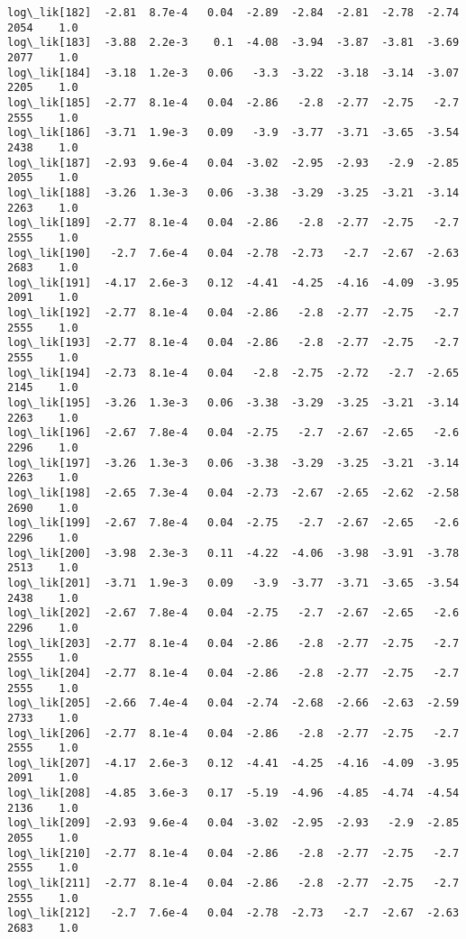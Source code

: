 \documentclass[11pt]{article}
\begin{document}
\begin{Verbatim}[commandchars=\\\{\}]
log\_lik[182]  -2.81  8.7e-4   0.04  -2.89  -2.84  -2.81  -2.78  -2.74   2054    1.0
log\_lik[183]  -3.88  2.2e-3    0.1  -4.08  -3.94  -3.87  -3.81  -3.69   2077    1.0
log\_lik[184]  -3.18  1.2e-3   0.06   -3.3  -3.22  -3.18  -3.14  -3.07   2205    1.0
log\_lik[185]  -2.77  8.1e-4   0.04  -2.86   -2.8  -2.77  -2.75   -2.7   2555    1.0
log\_lik[186]  -3.71  1.9e-3   0.09   -3.9  -3.77  -3.71  -3.65  -3.54   2438    1.0
log\_lik[187]  -2.93  9.6e-4   0.04  -3.02  -2.95  -2.93   -2.9  -2.85   2055    1.0
log\_lik[188]  -3.26  1.3e-3   0.06  -3.38  -3.29  -3.25  -3.21  -3.14   2263    1.0
log\_lik[189]  -2.77  8.1e-4   0.04  -2.86   -2.8  -2.77  -2.75   -2.7   2555    1.0
log\_lik[190]   -2.7  7.6e-4   0.04  -2.78  -2.73   -2.7  -2.67  -2.63   2683    1.0
log\_lik[191]  -4.17  2.6e-3   0.12  -4.41  -4.25  -4.16  -4.09  -3.95   2091    1.0
log\_lik[192]  -2.77  8.1e-4   0.04  -2.86   -2.8  -2.77  -2.75   -2.7   2555    1.0
log\_lik[193]  -2.77  8.1e-4   0.04  -2.86   -2.8  -2.77  -2.75   -2.7   2555    1.0
log\_lik[194]  -2.73  8.1e-4   0.04   -2.8  -2.75  -2.72   -2.7  -2.65   2145    1.0
log\_lik[195]  -3.26  1.3e-3   0.06  -3.38  -3.29  -3.25  -3.21  -3.14   2263    1.0
log\_lik[196]  -2.67  7.8e-4   0.04  -2.75   -2.7  -2.67  -2.65   -2.6   2296    1.0
log\_lik[197]  -3.26  1.3e-3   0.06  -3.38  -3.29  -3.25  -3.21  -3.14   2263    1.0
log\_lik[198]  -2.65  7.3e-4   0.04  -2.73  -2.67  -2.65  -2.62  -2.58   2690    1.0
log\_lik[199]  -2.67  7.8e-4   0.04  -2.75   -2.7  -2.67  -2.65   -2.6   2296    1.0
log\_lik[200]  -3.98  2.3e-3   0.11  -4.22  -4.06  -3.98  -3.91  -3.78   2513    1.0
log\_lik[201]  -3.71  1.9e-3   0.09   -3.9  -3.77  -3.71  -3.65  -3.54   2438    1.0
log\_lik[202]  -2.67  7.8e-4   0.04  -2.75   -2.7  -2.67  -2.65   -2.6   2296    1.0
log\_lik[203]  -2.77  8.1e-4   0.04  -2.86   -2.8  -2.77  -2.75   -2.7   2555    1.0
log\_lik[204]  -2.77  8.1e-4   0.04  -2.86   -2.8  -2.77  -2.75   -2.7   2555    1.0
log\_lik[205]  -2.66  7.4e-4   0.04  -2.74  -2.68  -2.66  -2.63  -2.59   2733    1.0
log\_lik[206]  -2.77  8.1e-4   0.04  -2.86   -2.8  -2.77  -2.75   -2.7   2555    1.0
log\_lik[207]  -4.17  2.6e-3   0.12  -4.41  -4.25  -4.16  -4.09  -3.95   2091    1.0
log\_lik[208]  -4.85  3.6e-3   0.17  -5.19  -4.96  -4.85  -4.74  -4.54   2136    1.0
log\_lik[209]  -2.93  9.6e-4   0.04  -3.02  -2.95  -2.93   -2.9  -2.85   2055    1.0
log\_lik[210]  -2.77  8.1e-4   0.04  -2.86   -2.8  -2.77  -2.75   -2.7   2555    1.0
log\_lik[211]  -2.77  8.1e-4   0.04  -2.86   -2.8  -2.77  -2.75   -2.7   2555    1.0
log\_lik[212]   -2.7  7.6e-4   0.04  -2.78  -2.73   -2.7  -2.67  -2.63   2683    1.0

\end{Verbatim}
\end{document}
